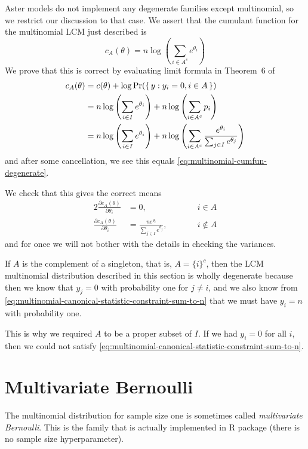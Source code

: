 Aster models do not implement any degenerate families except multinomial,
so we restrict our discussion to that case.  We assert that the
cumulant function for the multinomial LCM just described is
\begin{equation} \label{eq:multinomial-cumfun-degenerate}
   c_A(\theta) = n \log \left( \sum_{i \in A^c} e^{\theta_i} \right)
\end{equation}
We prove that this is correct by evaluating limit formula in Theorem~6
of \citet{geyer-gdor}
\begin{align*}
   c_A(\theta)
   & =
   c(\theta) + \log \Pr( \{\, y : y_i = 0, i \in A \,\} )
   \\
   & =
   n \log \left( \sum_{i \in I} e^{\theta_i} \right)
   +
   n \log \left( \sum_{i \in A^c} p_i \right)
   \\
   & =
   n \log \left( \sum_{i \in I} e^{\theta_i} \right)
   +
   n \log \left( \sum_{i \in A^c} \frac{e^{\theta_i}}
   {\sum_{j \in I} e^{\theta_j}} \right)
\end{align*}
and after some cancellation, we see this equals
\eqref{eq:multinomial-cumfun-degenerate}.

We check that this gives the correct means
\begin{alignat*}{2}
   \frac{\partial c_A(\theta)}{\partial \theta_i} & = 0, & \qquad & i \in A
   \\
   \frac{\partial c_A(\theta)}{\partial \theta_i}
   & = \frac{n e^{\theta_i}}{\sum_{j \in I} e^{\theta_j}}, & \qquad & i \notin A
\end{alignat*}
and for once we will not bother with the details in checking the variances.

If $A$ is the complement of a singleton, that is, $A = \{i\}^c$, then
the LCM multinomial distribution described in this section is wholly degenerate
because then we know that $y_j = 0$ with probability one for $j \neq i$,
and we also know from
\eqref{eq:multinomial-canonical-statistic-constraint-sum-to-n}
that we must have $y_i = n$ with probability one.

This is why we required $A$ to be a proper subset of $I$.
If we had $y_i = 0$ for all $i$, then we could not satisfy
\eqref{eq:multinomial-canonical-statistic-constraint-sum-to-n}.

\section{Multivariate Bernoulli}

The multinomial distribution for sample size one is sometimes called
\emph{multivariate Bernoulli}.  This is the family that is actually
implemented in R package  (there is no sample size
hyperparameter).


